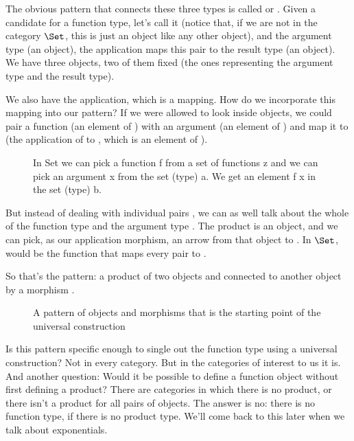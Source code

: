 The obvious pattern that connects these three types is called
 or . Given a candidate for
a function type, let's call it  (notice that, if we are not in
the category $\Set$, this is just an object like any other
object), and the argument type  (an object), the application
maps this pair to the result type  (an object). We have three
objects, two of them fixed (the ones representing the argument type and
the result type).

We also have the application, which is a mapping. How do we incorporate
this mapping into our pattern? If we were allowed to look inside
objects, we could pair a function  (an element of )
with an argument  (an element of ) and map it to
 (the application of  to , which is an
element of ).

\begin{figure}
\centering
{}
\caption{In Set we can pick a function f from a set of functions z and we can
pick an argument x from the set (type) a. We get an element f x in the
set (type) b.}
\end{figure}

But instead of dealing with individual pairs , we can as
well talk about the whole  of the function type 
and the argument type . The product  is an object,
and we can pick, as our application morphism, an arrow  from
that object to . In $\Set$,  would be the
function that maps every pair  to .

So that's the pattern: a product of two objects  and
 connected to another object  by a morphism
.

\begin{figure}
\centering
{}
\caption{A pattern of objects and morphisms that is the starting point of the
universal construction}
\end{figure}

Is this pattern specific enough to single out the function type using a
universal construction? Not in every category. But in the categories of
interest to us it is. And another question: Would it be possible to
define a function object without first defining a product? There are
categories in which there is no product, or there isn't a product for
all pairs of objects. The answer is no: there is no function type, if
there is no product type. We'll come back to this later when we talk
about exponentials.

